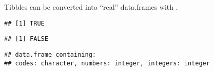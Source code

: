 \documentclass[krantz2]{krantz}\usepackage{knitr}
\begin{document}
Tibbles can be converted into ``real'' data.frames with .

\begin{knitrout}\footnotesize
{}\color{fgcolor}\begin{kframe}
\begin{alltt}
 \hlkwb{<-} 
\end{alltt}
\begin{verbatim}
## [1] TRUE
\end{verbatim}
\begin{alltt}
\end{alltt}
\begin{verbatim}
## [1] FALSE
\end{verbatim}
\begin{alltt}
\end{alltt}
\begin{verbatim}
## data.frame containing:
## codes: character, numbers: integer, integers: integer
\end{verbatim}
\end{kframe}
\end{knitrout}
\end{document}
